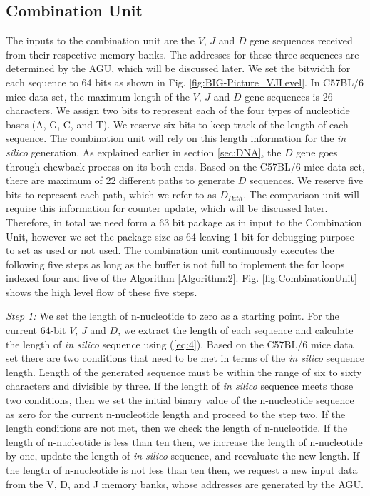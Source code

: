 \subsection{Combination Unit }\label{subsec:Comb}
The inputs to the combination unit are the $V$, $J$ and $D$ gene sequences received from their respective memory banks. The addresses for these three sequences are determined by the AGU, which will be discussed later. We set the bitwidth for each sequence to 64 bits as shown in Fig. \ref{fig:BIG-Picture_VJLevel}.  In C57BL/6 mice data set, the maximum length of the  $V$, $J$ and $D$ gene sequences is 26 characters. We assign two bits to represent each of the four types of nucleotide bases (A, G, C, and T). We reserve six bits to keep track of the length of each sequence. The combination unit will rely on this length information for the \emph{in silico} generation.  As explained earlier in section \ref{sec:DNA}, the $D$ gene goes through chewback process on its both ends. Based on the C57BL/6 mice data set,  there are maximum of 22 different paths to generate $D$ sequences. We reserve five bits to represent each path, which we refer to as $D_{Path}$. The comparison unit will require this information for counter update, which will be discussed later. Therefore, in total we need form a 63 bit package as in input to the Combination Unit, however we set the package size as 64 leaving 1-bit  for debugging purpose to set as used or not used. The combination unit continuously executes the following five steps as long as the buffer is not full to implement the for loops indexed four and five of the Algorithm \ref{Algorithm:2}. Fig. \ref{fig:CombinationUnit} shows the high level flow of these five steps.
 
\emph{Step 1:} We set the length of n-nucleotide to zero as a starting point. For the current 64-bit  $V$, $J$ and $D$, we extract the length of each sequence and calculate the length of \emph{in silico} sequence using (\ref{eq:4}). Based on the C57BL/6 mice data set there are two conditions that need to be met in terms of the \emph{in silico} sequence length. Length of the generated sequence must be within the range of six to sixty characters and divisible by three. If the length of \emph{in silico} sequence meets those two conditions, then we set the initial binary value of the n-nucleotide sequence as zero for the current n-nucleotide length and proceed to the step two. If the length conditions are not met,  then we check the length of n-nucleotide.  If the length of n-nucleotide is less than ten then, we increase the length of n-nucleotide by one, update the length of \emph{in silico} sequence, and  reevaluate the new length. If the length of n-nucleotide is not less than ten then, we request a new input data from the V, D, and J memory banks, whose addresses are generated by the AGU.

